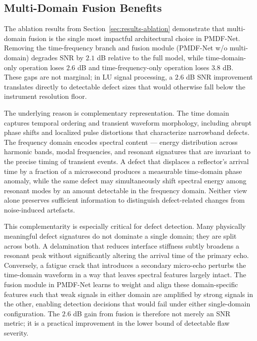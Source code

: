 \subsection{Multi-Domain Fusion Benefits}
\label{sec:discussion-fusion}

The ablation results from Section~\ref{sec:results-ablation} demonstrate that multi-domain fusion is the single most impactful architectural choice in PMDF-Net. Removing the time-frequency branch and fusion module (PMDF-Net w/o multi-domain) degrades SNR by $2.1$ dB relative to the full model, while time-domain-only operation loses $2.6$ dB and time-frequency-only operation loses $3.8$ dB. These gaps are not marginal; in LU signal processing, a $2.6$ dB SNR improvement translates directly to detectable defect sizes that would otherwise fall below the instrument resolution floor.

The underlying reason is complementary representation. The time domain captures temporal ordering and transient waveform morphology, including abrupt phase shifts and localized pulse distortions that characterize narrowband defects. The frequency domain encodes spectral content --- energy distribution across harmonic bands, modal frequencies, and resonant signatures that are invariant to the precise timing of transient events. A defect that displaces a reflector's arrival time by a fraction of a microsecond produces a measurable time-domain phase anomaly, while the same defect may simultaneously shift spectral energy among resonant modes by an amount detectable in the frequency domain. Neither view alone preserves sufficient information to distinguish defect-related changes from noise-induced artefacts.

This complementarity is especially critical for defect detection. Many physically meaningful defect signatures do not dominate a single domain; they are split across both. A delamination that reduces interface stiffness subtly broadens a resonant peak without significantly altering the arrival time of the primary echo. Conversely, a fatigue crack that introduces a secondary micro-echo perturbs the time-domain waveform in a way that leaves spectral features largely intact. The fusion module in PMDF-Net learns to weight and align these domain-specific features such that weak signals in either domain are amplified by strong signals in the other, enabling detection decisions that would fail under either single-domain configuration. The $2.6$ dB gain from fusion is therefore not merely an SNR metric; it is a practical improvement in the lower bound of detectable flaw severity.